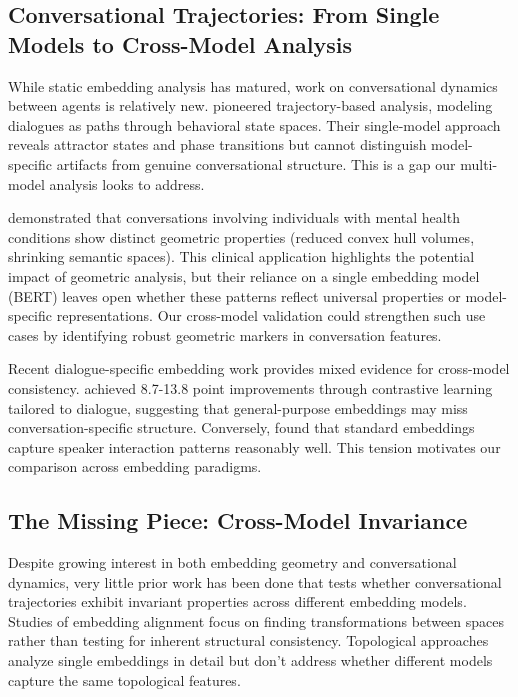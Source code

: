 \documentclass[11pt,letterpaper]{article}
\begin{document}
\subsection{Conversational Trajectories: From Single Models to Cross-Model Analysis}

While static embedding analysis has matured, work on conversational dynamics between agents is relatively new. \citet{brinberg2024dynamic} pioneered trajectory-based analysis, modeling dialogues as paths through behavioral state spaces. Their single-model approach reveals attractor states and phase transitions but cannot distinguish model-specific artifacts from genuine conversational structure. This is a gap our multi-model analysis looks to address.

\citet{palominos2024trajectories} demonstrated that conversations involving individuals with mental health conditions show distinct geometric properties (reduced convex hull volumes, shrinking semantic spaces). This clinical application highlights the potential impact of geometric analysis, but their reliance on a single embedding model (BERT) leaves open whether these patterns reflect universal properties or model-specific representations. Our cross-model validation could strengthen such use cases by identifying robust geometric markers in conversation features.

Recent dialogue-specific embedding work provides mixed evidence for cross-model consistency. \citet{dialoguecse2021} achieved 8.7-13.8 point improvements through contrastive learning tailored to dialogue, suggesting that general-purpose embeddings may miss conversation-specific structure. Conversely, \citet{dial2vec2022} found that standard embeddings capture speaker interaction patterns reasonably well. This tension motivates our comparison across embedding paradigms.

\subsection{The Missing Piece: Cross-Model Invariance}

Despite growing interest in both embedding geometry and conversational dynamics, very little prior work has been done that tests whether conversational trajectories exhibit invariant properties across different embedding models. Studies of embedding alignment \citep{conneau2018word} focus on finding transformations between spaces rather than testing for inherent structural consistency. Topological approaches \citep{jakubowski2020topology, vukovic2022dialogue} analyze single embeddings in detail but don't address whether different models capture the same topological features.
\end{document}
